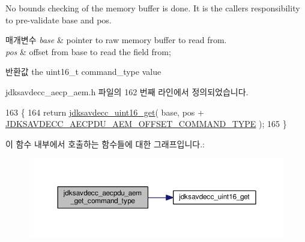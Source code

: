 No bounds checking of the memory buffer is done. It is the caller\textquotesingle{}s responsibility to pre-\/validate base and pos.


\begin{DoxyParams}{매개변수}
{\em base} & pointer to raw memory buffer to read from. \\
\hline
{\em pos} & offset from base to read the field from; \\
\hline
\end{DoxyParams}
\begin{DoxyReturn}{반환값}
the uint16\+\_\+t command\+\_\+type value 
\end{DoxyReturn}


jdksavdecc\+\_\+aecp\+\_\+aem.\+h 파일의 162 번째 라인에서 정의되었습니다.


\begin{DoxyCode}
163 \{
164     \textcolor{keywordflow}{return} \hyperlink{group__endian_ga3fbbbc20be954aa61e039872965b0dc9}{jdksavdecc\_uint16\_get}( base, pos + 
      \hyperlink{group__aecpdu__aem_gae336db3c3e35b3be2ef2fe34780e4bd2}{JDKSAVDECC\_AECPDU\_AEM\_OFFSET\_COMMAND\_TYPE} );
165 \}
\end{DoxyCode}


이 함수 내부에서 호출하는 함수들에 대한 그래프입니다.\+:
\nopagebreak
\begin{figure}[H]
\begin{center}
\leavevmode
\includegraphics[width=350pt]{group__aecpdu__aem_ga61a282324f09f449059b9fe710363710_cgraph}
\end{center}
\end{figure}




